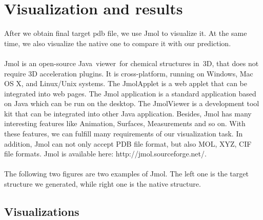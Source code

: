 \documentclass{article}
\begin{document}
\section{Visualization and results}

   After we obtain final target pdb file, we use Jmol to visualize it. At the same time, we also visualize the native one to compare it with our prediction.\\\\
Jmol is an open-source Java viewer for chemical structures in 3D, that does not require 3D acceleration plugins. It is cross-platform, running on Windows, Mac OS X, and Linux/Unix systems. The JmolApplet is a web applet that can be integrated into web pages. The Jmol application is a standard application based on Java which can be run on the desktop. The JmolViewer is a development tool kit that can be integrated into other Java application. Besides, Jmol has many interesting features like Animation, Surfaces, Measurements and so on. With these features, we can fulfill many requirements of our visualization task. In addition, Jmol can not only accept PDB file format, but also MOL, XYZ, CIF file formats. Jmol is available here: http://jmol.sourceforge.net/.\\\\
The following two figures are two examples of Jmol. The left one is the target structure we generated, while right one is the native structure.

\subsection{Visualizations}
\end{document}
